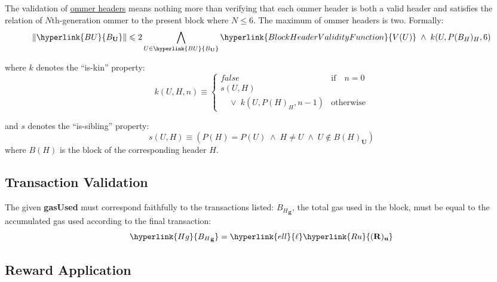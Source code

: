 \documentclass[9pt,oneside]{amsart}
\begin{document}
\begin{multicols}{2}
The validation of \hyperlink{ommerheaders}{ommer headers} means nothing more than verifying that each ommer header is both a valid header and satisfies the relation of $N$th-generation ommer to the present block where $N \leq 6$. The maximum of ommer headers is two. Formally:
\begin{equation}
\lVert \hyperlink{B U}{B_\mathbf{U}} \rVert \leqslant 2 \bigwedge_{U \in \hyperlink{B U}{B_\mathbf{U}}} \hyperlink{BlockHeaderValidityFunction}{V(U)} \; \wedge \; k(U, P(B_H)_H, 6)
\end{equation}

where $k$ denotes the ``is-kin'' property:
\begin{equation}
k(U, H, n) \equiv \begin{cases} false & \text{if} \quad n = 0 \\
s(U, H) &\\
\quad \vee \; k(U, P(H)_H, n - 1) & \text{otherwise}
\end{cases}
\end{equation}

and $s$ denotes the ``is-sibling'' property:
\begin{equation}
s(U, H) \equiv (P(H) = P(U)\; \wedge \; H \neq U \; \wedge \; U \notin B(H)_\mathbf{U})
\end{equation}
where $B(H)$ is the block of the corresponding header $H$.

\subsection{Transaction Validation}


The given \textbf{gasUsed} must correspond faithfully to the transactions listed: \hyperlink{H g}{${B_H}_\mathbf{g}$}, the total gas used in the block, must be equal to the accumulated gas used according to the final transaction:
\begin{equation}
\hyperlink{H g}{{B_H}_\mathbf{g}} = \hyperlink{ell}{\ell}\hyperlink{R u}{(\mathbf{R})_\mathbf{u}}
\end{equation}

\subsection{Reward Application}


\end{multicols}
\end{document}
